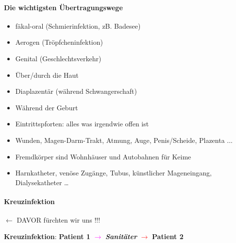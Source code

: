 \documentclass{article}
\newcommand\gT[1]{\textbf{\textup{\textcolor[rgb]{0.0,0.5019608,0.0}{#1}}}}
\newcommand\gH[1]{\textmd{\textcolor[rgb]{0.0,0.0,0.5019608}{#1}}}
\begin{document}
\paragraph[Die wichtigsten \"Ubertragungswege]{Die wichtigsten
\"Ubertragungswege}
\begin{itemize}
\item {\mdseries
f\"akal-oral (Schmierinfektion, zB. Badesee)}

\item {\mdseries
Aerogen (Tr\"opfcheninfektion)}

\item {\mdseries
Genital (Geschlechtsverkehr)}

\item {\mdseries
\"Uber/durch die Haut}

\item {\mdseries
Diaplazent\"ar (w\"ahrend Schwangerschaft)}

\item {\mdseries
W\"ahrend der Geburt}

\item {\mdseries
Eintrittspforten: alles was irgendwie offen ist}

\end{itemize}
\begin{itemize}
\item {\mdseries
Wunden, Magen-Darm-Trakt, Atmung, Auge, Penis/Scheide, Plazenta ...}

\end{itemize}
\begin{itemize}
\item {\mdseries
Fremdk\"orper sind Wohnh\"auser und Autobahnen f\"ur Keime}

\end{itemize}
\begin{itemize}
\item {\mdseries
Harnkatheter, ven\"ose Zug\"ange, Tubus, k\"unstlicher Mageneingang,
Dialysekatheter {\dots}}

\end{itemize}
\paragraph[]{}
\paragraph[Kreuzinfektion]{Kreuzinfektion}
\begin{center}
\begin{minipage}{6.477cm}
{\mdseries
\gH{${\leftarrow}$ DAVOR f\"urchten wir uns !!!}}

\end{minipage}
\end{center}
{\mdseries
{}\gT{Kreuzinfektion}:
\textbf{Patient 1} \textbf{\textcolor{magenta}{${\rightarrow}$}}
\textbf{\textit{Sanit\"ater}} \textbf{\textcolor{red}{${\rightarrow}$}}
\textbf{Patient 2}}
\end{document}
